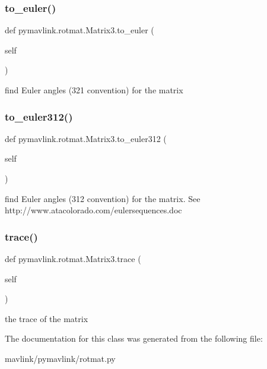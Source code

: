 \subsubsection{\texorpdfstring{to\+\_\+euler()}{to\_euler()}}
{\footnotesize\ttfamily def pymavlink.\+rotmat.\+Matrix3.\+to\+\_\+euler (\begin{DoxyParamCaption}\item[{}]{self }\end{DoxyParamCaption})}

\begin{DoxyVerb}find Euler angles (321 convention) for the matrix\end{DoxyVerb}
 \mbox{\label{classpymavlink_1_1rotmat_1_1Matrix3_a2c98ce17c4aea40f8de2ea1716000ea4}} 
\subsubsection{\texorpdfstring{to\+\_\+euler312()}{to\_euler312()}}
{\footnotesize\ttfamily def pymavlink.\+rotmat.\+Matrix3.\+to\+\_\+euler312 (\begin{DoxyParamCaption}\item[{}]{self }\end{DoxyParamCaption})}

\begin{DoxyVerb}find Euler angles (312 convention) for the matrix.
See http://www.atacolorado.com/eulersequences.doc
\end{DoxyVerb}
 \mbox{\label{classpymavlink_1_1rotmat_1_1Matrix3_ac10cb8963613b9febb43869cd22c58cf}} 
\subsubsection{\texorpdfstring{trace()}{trace()}}
{\footnotesize\ttfamily def pymavlink.\+rotmat.\+Matrix3.\+trace (\begin{DoxyParamCaption}\item[{}]{self }\end{DoxyParamCaption})}

\begin{DoxyVerb}the trace of the matrix\end{DoxyVerb}
 

The documentation for this class was generated from the following file\+:\begin{DoxyCompactItemize}
\item 
mavlink/pymavlink/rotmat.\+py\end{DoxyCompactItemize}
